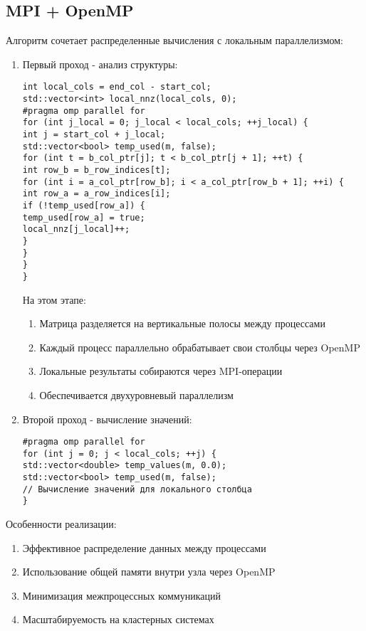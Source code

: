 \documentclass[12pt]{article}
\begin{document}
\subsection{MPI + OpenMP}
Алгоритм сочетает распределенные вычисления с локальным параллелизмом:
\begin{enumerate}
\item Первый проход - анализ структуры:
\begin{lstlisting}
int local_cols = end_col - start_col;
std::vector<int> local_nnz(local_cols, 0);
#pragma omp parallel for
for (int j_local = 0; j_local < local_cols; ++j_local) {
int j = start_col + j_local;
std::vector<bool> temp_used(m, false);
for (int t = b_col_ptr[j]; t < b_col_ptr[j + 1]; ++t) {
int row_b = b_row_indices[t];
for (int i = a_col_ptr[row_b]; i < a_col_ptr[row_b + 1]; ++i) {
int row_a = a_row_indices[i];
if (!temp_used[row_a]) {
temp_used[row_a] = true;
local_nnz[j_local]++;
}
}
}
}
\end{lstlisting}
На этом этапе:
\begin{enumerate}
\item Матрица разделяется на вертикальные полосы между процессами
\item Каждый процесс параллельно обрабатывает свои столбцы через OpenMP
\item Локальные результаты собираются через MPI-операции
\item Обеспечивается двухуровневый параллелизм
\end{enumerate}
\item Второй проход - вычисление значений:
\begin{lstlisting}
#pragma omp parallel for
for (int j = 0; j < local_cols; ++j) {
std::vector<double> temp_values(m, 0.0);
std::vector<bool> temp_used(m, false);
// Вычисление значений для локального столбца
}
\end{lstlisting}
\end{enumerate}
Особенности реализации:
\begin{enumerate}
\item Эффективное распределение данных между процессами
\item Использование общей памяти внутри узла через OpenMP
\item Минимизация межпроцессных коммуникаций
\item Масштабируемость на кластерных системах
\end{enumerate}
\end{document}
